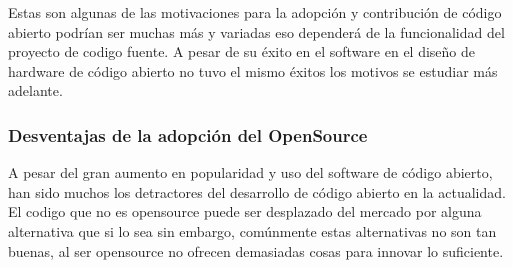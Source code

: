  Estas son algunas de las motivaciones para la adopción y contribución de código abierto podrían ser muchas más y variadas eso dependerá de la funcionalidad del proyecto de codigo fuente. A pesar de su éxito en el software en el diseño de hardware de código abierto  no tuvo el mismo éxitos los motivos se estudiar más adelante.

\subsubsection{Desventajas de la adopción del OpenSource}

A pesar del gran aumento en popularidad y uso del software de código abierto, han sido muchos los detractores del desarrollo de código abierto en la actualidad. 
El codigo que no es opensource puede ser desplazado del mercado por alguna alternativa que si lo sea sin embargo, comúnmente estas alternativas no son tan buenas, al ser opensource no ofrecen demasiadas cosas para innovar lo suficiente.

